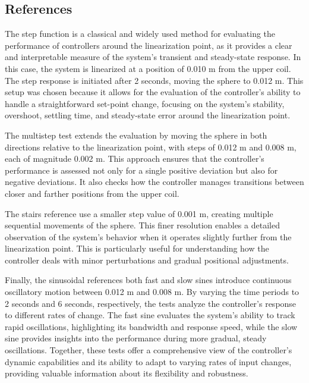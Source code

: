 \subsection{References}
\label{subsec:references}

The step function is a classical and widely used method for evaluating the performance of controllers around the linearization point, as it provides a clear and interpretable measure of the system's transient and steady-state response. In this case, the system is linearized at a position of 0.010 m from the upper coil. The step response is initiated after 2 seconds, moving the sphere to 0.012 m. This setup was chosen because it allows for the evaluation of the controller's ability to handle a straightforward set-point change, focusing on the system's stability, overshoot, settling time, and steady-state error around the linearization point.

The multistep test extends the evaluation by moving the sphere in both directions relative to the linearization point, with steps of 0.012 m and 0.008 m, each of magnitude 0.002 m. This approach ensures that the controller's performance is assessed not only for a single positive deviation but also for negative deviations. It also checks how the controller manages transitions between closer and farther positions from the upper coil.

The stairs reference use a smaller step value of 0.001 m, creating multiple sequential movements of the sphere. This finer resolution enables a detailed observation of the system's behavior when it operates slightly further from the linearization point. This is particularly useful for understanding how the controller deals with minor perturbations and gradual positional adjustments.

Finally, the sinusoidal references both fast and slow sines introduce continuous oscillatory motion between 0.012 m and 0.008 m. By varying the time periods to 2 seconds and 6 seconds, respectively, the tests analyze the controller's response to different rates of change. The fast sine evaluates the system's ability to track rapid oscillations, highlighting its bandwidth and response speed, while the slow sine provides insights into the performance during more gradual, steady oscillations. Together, these tests offer a comprehensive view of the controller's dynamic capabilities and its ability to adapt to varying rates of input changes, providing valuable information about its flexibility and robustness.

